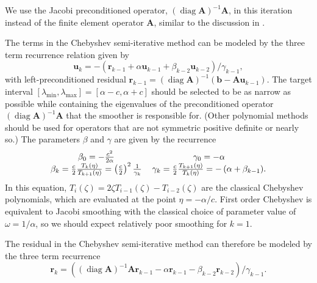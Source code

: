 \documentclass[review]{siamart190516}
\DeclareMathOperator{\diag}{diag}
\begin{document}
We use the Jacobi preconditioned operator, $\left( \diag {\mathbf{A}} \right)^{-1} {\mathbf{A}}$, in this iteration instead of the finite element operator ${\mathbf{A}}$, similar to the discussion in \cite{adams2003parallel}.

The terms in the Chebyshev semi-iterative method can be modeled by the three term recurrence relation given by
\begin{equation}
\mathbf{u}_k = - \left( \mathbf{r}_{k - 1} + \alpha \mathbf{u}_{k - 1} + \beta_{k - 2} \mathbf{u}_{k - 2} \right) / \gamma_{k - 1},
\label{eq:chebyshev_recursive}
\end{equation}
with left-preconditioned residual $\mathbf r_{k-1} = \left( \diag {\mathbf{A}} \right)^{-1} \left( \mathbf b - \mathbf A \mathbf u_{k-1} \right)$.
The target interval $[\lambda_{\min}, \lambda_{\max}] = [\alpha - c, \alpha + c]$ should be selected to be as narrow as possible while containing the eigenvalues of the preconditioned operator $\left( \diag {\mathbf{A}} \right)^{-1} \mathbf A$ that the smoother is responsible for.
(Other polynomial methods should be used for operators that are not symmetric positive definite or nearly so.)
The parameters $\beta$ and $\gamma$ are given by the recurrence
\begin{equation}
\begin{tabular}{c c}
$\beta_0 = - \frac{c^2}{2 \alpha}$ & $\gamma_0 = - \alpha$\\
$\beta_k = \frac{c}{2} \frac{T_k \left( \eta \right)}{T_{k + 1} \left( \eta \right)} = \left( \frac{c}{2} \right)^2 \frac{1}{\gamma_k}$ & $\gamma_k = \frac{c}{2} \frac{T_{k + 1} \left( \eta \right)}{T_k \left( \eta \right)} = - \left( \alpha + \beta_{k - 1} \right)$.
\end{tabular}
\end{equation}
In this equation, $T_i \left( \zeta \right) = 2 \zeta T_{i - 1} \left( \zeta \right) - T_{i - 2} \left( \zeta \right)$ are the classical Chebyshev polynomials, which are evaluated at the point $\eta = - \alpha / c$.
First order Chebyshev is equivalent to Jacobi smoothing with the classical choice of parameter value of $\omega = 1 / \alpha$, so we should expect relatively poor smoothing for $k = 1$.

The residual in the Chebyshev semi-iterative method can therefore be modeled by the three term recurrence
\begin{equation}
\mathbf{r}_k = \left( \left( \diag {\mathbf{A}} \right)^{-1} {\mathbf{A}} \mathbf{r}_{k - 1} - \alpha \mathbf{r}_{k - 1} - \beta_{k - 2} \mathbf{r}_{k - 2} \right) / \gamma_{k - 1}.
\label{eq:chebyshev_error_recursive}
\end{equation}
\end{document}
